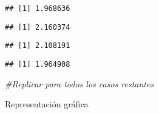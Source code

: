 \documentclass[
]{article}
\newenvironment{Shaded}{\begin{snugshade}}{\end{snugshade}}
\newcommand{\CommentTok}[1]{\textcolor[rgb]{0.56,0.35,0.01}{\textit{#1}}}
\newcommand{\KeywordTok}[1]{\textcolor[rgb]{0.13,0.29,0.53}{\textbf{#1}}}
\newcommand{\NormalTok}[1]{#1}
\newcommand{\OperatorTok}[1]{\textcolor[rgb]{0.81,0.36,0.00}{\textbf{#1}}}
\begin{document}
\begin{verbatim}
## [1] 1.968636
\end{verbatim}

\begin{Shaded}
\end{Shaded}

\begin{verbatim}
## [1] 2.160374
\end{verbatim}

\begin{Shaded}
\end{Shaded}

\begin{verbatim}
## [1] 2.108191
\end{verbatim}

\begin{Shaded}
\end{Shaded}

\begin{verbatim}
## [1] 1.964908
\end{verbatim}

\begin{Shaded}
\begin{Highlighting}[]
  \CommentTok{#Replicar para todos los casos restantes}
\end{Highlighting}
\end{Shaded}

Representación gráfica
\end{document}
